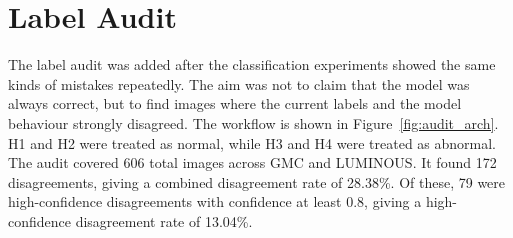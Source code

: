 \section{Label Audit}
The label audit was added after the classification experiments showed the same kinds of mistakes repeatedly. The aim was not to claim that the model was always correct, but to find images where the current labels and the model behaviour strongly disagreed. The workflow is shown in Figure~\ref{fig:audit_arch}. H1 and H2 were treated as normal, while H3 and H4 were treated as abnormal. The audit covered 606 total images across GMC and LUMINOUS. It found 172 disagreements, giving a combined disagreement rate of 28.38\%. Of these, 79 were high-confidence disagreements with confidence at least 0.8, giving a high-confidence disagreement rate of 13.04\%.

\begin{table}[H]
\centering
\scriptsize
{}
\caption{Combined GMC and LUMINOUS image audit summary}
\label{tab:audit_summary}
\end{table}

\begin{table}[H]
\centering
\scriptsize
{}
\caption{Class-wise label audit results}
\label{tab:audit_classwise}
\end{table}

